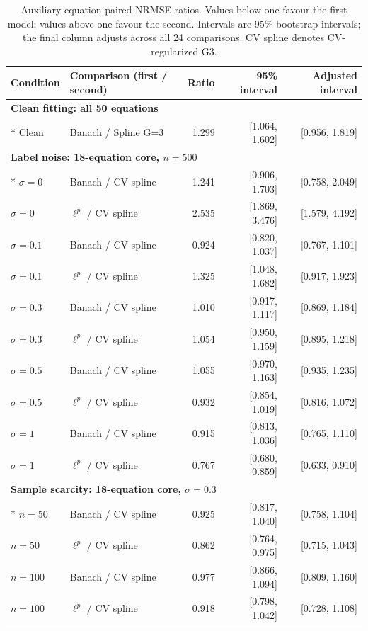 \begin{table}[!htbp]\centering\small
\caption{Auxiliary equation-paired NRMSE ratios. Values below one favour the first model; values above one favour the second. Intervals are 95\% bootstrap intervals; the final column adjusts across all 24 comparisons. CV spline denotes CV-regularized G3.}\label{tab:paired}
\begin{tabular}{llrrr}
\toprule Condition & Comparison (first / second) & Ratio & 95\% interval & Adjusted interval \\ \midrule
\multicolumn{5}{l}{\textbf{Clean fitting: all 50 equations}}\\*
Clean & Banach / Spline G=3 & 1.299 & [1.064, 1.602] & [0.956, 1.819] \\
\multicolumn{5}{l}{\textbf{Label noise: 18-equation core, $n=500$}}\\*
$\sigma=0$ & Banach / CV spline & 1.241 & [0.906, 1.703] & [0.758, 2.049] \\
$\sigma=0$ & $\ell^p$ / CV spline & 2.535 & [1.869, 3.476] & [1.579, 4.192] \\
$\sigma=0.1$ & Banach / CV spline & 0.924 & [0.820, 1.037] & [0.767, 1.101] \\
$\sigma=0.1$ & $\ell^p$ / CV spline & 1.325 & [1.048, 1.682] & [0.917, 1.923] \\
$\sigma=0.3$ & Banach / CV spline & 1.010 & [0.917, 1.117] & [0.869, 1.184] \\
$\sigma=0.3$ & $\ell^p$ / CV spline & 1.054 & [0.950, 1.159] & [0.895, 1.218] \\
$\sigma=0.5$ & Banach / CV spline & 1.055 & [0.970, 1.163] & [0.935, 1.235] \\
$\sigma=0.5$ & $\ell^p$ / CV spline & 0.932 & [0.854, 1.019] & [0.816, 1.072] \\
$\sigma=1$ & Banach / CV spline & 0.915 & [0.813, 1.036] & [0.765, 1.110] \\
$\sigma=1$ & $\ell^p$ / CV spline & 0.767 & [0.680, 0.859] & [0.633, 0.910] \\
\multicolumn{5}{l}{\textbf{Sample scarcity: 18-equation core, $\sigma=0.3$}}\\*
$n=50$ & Banach / CV spline & 0.925 & [0.817, 1.040] & [0.758, 1.104] \\
$n=50$ & $\ell^p$ / CV spline & 0.862 & [0.764, 0.975] & [0.715, 1.043] \\
$n=100$ & Banach / CV spline & 0.977 & [0.866, 1.094] & [0.809, 1.160] \\
$n=100$ & $\ell^p$ / CV spline & 0.918 & [0.798, 1.042] & [0.728, 1.108] \\

\end{tabular}
\end{table}
